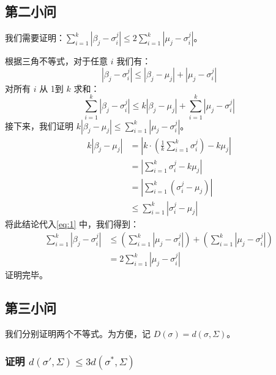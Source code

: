 \documentclass{ctexart}
\begin{document}
\subsection{第二小问}
我们需要证明：$ \sum_{i=1}^{k} |\beta_j - \sigma_i^j| \le 2 \sum_{i=1}^{k} |\mu_j - \sigma_i^j| $。


根据三角不等式，对于任意 $i$ 我们有：
$$ |\beta_j - \sigma_i^j| \le |\beta_j - \mu_j| + |\mu_j - \sigma_i^j| $$
对所有 $i$ 从 1到 $k$ 求和：
\begin{equation*} \label{eq:1} \tag{*}
\sum_{i=1}^{k} |\beta_j - \sigma_i^j| \le k|\beta_j - \mu_j| + \sum_{i=1}^{k} |\mu_j - \sigma_i^j|
\end{equation*}
接下来，我们证明 $k|\beta_j - \mu_j| \le \sum_{i=1}^{k} |\mu_j - \sigma_i^j|$。
\begin{align*}
k|\beta_j - \mu_j| &= \left| k \cdot \left(\frac{1}{k}\sum_{i=1}^{k}\sigma_i^j\right) - k\mu_j \right| \\
&= \left| \sum_{i=1}^{k} \sigma_i^j - k\mu_j \right| \\
&= \left| \sum_{i=1}^{k} (\sigma_i^j - \mu_j) \right| \\
&\le \sum_{i=1}^{k} |\sigma_i^j - \mu_j|
\end{align*}
将此结论代入\cref{eq:1} 中，我们得到：
\begin{align*}
\sum_{i=1}^{k} |\beta_j - \sigma_i^j| &\le \left(\sum_{i=1}^{k} |\mu_j - \sigma_i^j|\right) + \left(\sum_{i=1}^{k} |\mu_j - \sigma_i^j|\right) \\
&= 2 \sum_{i=1}^{k} |\mu_j - \sigma_i^j|
\end{align*}
证明完毕。


\subsection{第三小问}
我们分别证明两个不等式。为方便，记 $D(\sigma) = d(\sigma, \Sigma)$。

\subsubsection{证明 $d(\sigma', \Sigma) \le 3d(\sigma^*, \Sigma)$}
\end{document}
